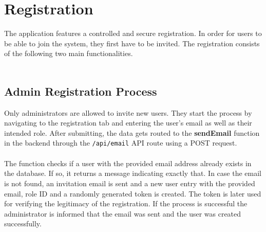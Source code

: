 \documentclass[a4paper,12pt]{report}
\begin{document}
\section{Registration}
The application features a controlled and secure registration. In order for users to be able to join the system, they first have to be invited. The registration consists of the following two main functionalities. \\\\
\subsection{Admin Registration Process}
Only administrators are allowed to invite new users. They start the process by navigating to the registration tab and entering the user's email as well as their intended role. After submitting, the data gets routed to the \textbf{sendEmail} function in the backend through the \texttt{/api/email} API route using a POST request. \\\\
The function checks if a user with the provided email address already exists in the database. If so, it returns a message indicating exactly that. In case the email is not found, an invitation email is sent and a new user entry with the provided email, role ID and a randomly generated token is created. The token is later used for verifying the legitimacy of the registration. If the process is successful the administrator is informed that the email was sent and the user was created successfully. \\\\
\end{document}
